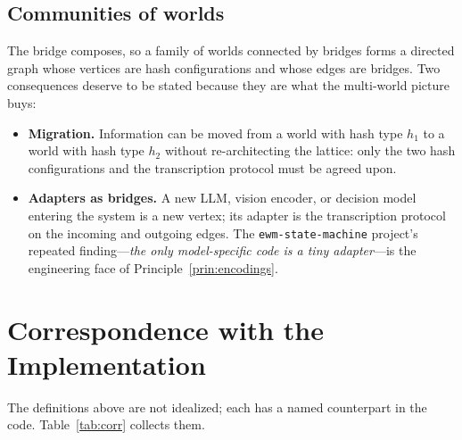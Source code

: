 \documentclass[11pt,a4paper]{article}
\theoremstyle{remark}
\begin{document}
\subsection{Communities of worlds}

The bridge composes, so a family of worlds connected by bridges forms a directed
graph whose vertices are hash configurations and whose edges are bridges. Two
consequences deserve to be stated because they are what the multi-world picture
buys:

\begin{itemize}[leftmargin=*,nosep]
  \item \textbf{Migration.} Information can be moved from a world with hash
    type $h_1$ to a world with hash type $h_2$ without re-architecting the
    lattice: only the two hash configurations and the transcription protocol
    must be agreed upon.
  \item \textbf{Adapters as bridges.} A new LLM, vision encoder, or decision
    model entering the system is a new vertex; its adapter is the transcription
    protocol on the incoming and outgoing edges. The \texttt{ewm-state-machine}
    project's repeated finding---\emph{the only model-specific code is a tiny
    adapter}---is the engineering face of Principle~\ref{prin:encodings}.
\end{itemize}

\section{Correspondence with the Implementation}

The definitions above are not idealized; each has a named counterpart in the
code. Table~\ref{tab:corr} collects them.
\end{document}

